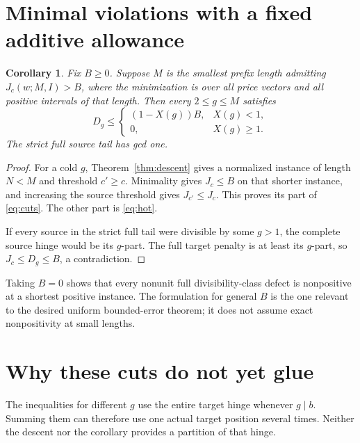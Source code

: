 \documentclass[a4paper,11pt]{article}
\newtheorem{corollary}[theorem]{Corollary}
\begin{document}
\section{Minimal violations with a fixed additive allowance}
\begin{corollary}\label{cor:min}
Fix $B\ge0$. Suppose $M$ is the smallest prefix length admitting $J_c(w;M,I)>B$, where the minimization is over all price vectors and all positive intervals of that length. Then every $2\le g\le M$ satisfies
\begin{equation}\label{eq:cuts}
 \boxed{D_g\le
 \begin{cases}
 (1-X(g))B,&X(g)<1,\\
 0,&X(g)\ge1.
 \end{cases}}
\end{equation}
The strict full source tail has gcd one.
\end{corollary}
\begin{proof}
For a cold $g$, Theorem~\ref{thm:descent} gives a normalized instance of length $N<M$ and threshold $c'\ge c$. Minimality gives $J_c\le B$ on that shorter instance, and increasing the source threshold gives $J_{c'}\le J_c$. This proves its part of \eqref{eq:cuts}. The other part is \eqref{eq:hot}.

If every source in the strict full tail were divisible by some $g>1$, the complete source hinge would be its $g$-part. The full target penalty is at least its $g$-part, so $J_c\le D_g\le B$, a contradiction.
\end{proof}

Taking $B=0$ shows that every nonunit full divisibility-class defect is nonpositive at a shortest positive instance. The formulation for general $B$ is the one relevant to the desired uniform bounded-error theorem; it does not assume exact nonpositivity at small lengths.

\section{Why these cuts do not yet glue}
The inequalities for different $g$ use the entire target hinge whenever $g\mid b$. Summing them can therefore use one actual target position several times. Neither the descent nor the corollary provides a partition of that hinge.
\end{document}
